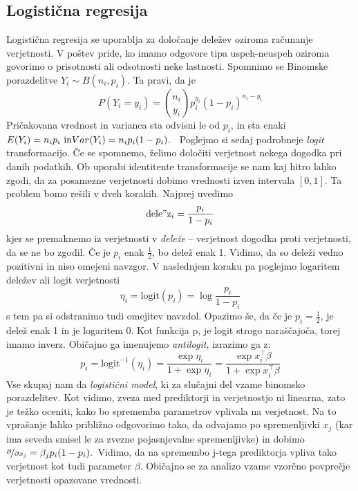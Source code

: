 \documentclass[12pt,a4paper]{amsart}
\theoremstyle{definition} %
\theoremstyle{plain} %
\begin{document}

\subsection{Logistična regresija}
Logistična regresija se uporablja za določanje deležev oziroma računanje verjetnosti. V poštev pride, ko imamo odgovore tipa uspeh-neuspeh oziroma
govorimo o prisotnosti ali odsotnosti neke lastnosti.
Spomnimo se Binomske porazdelitve $Y_{i} \sim B(n_{i}, p_{i})$. Ta pravi, da je 
\[
    P(Y_{i} = y_{i}) = {n_{i} \choose y_{i}} p_{i}^{y_{i}}(1 - p_{i}) ^{n_{i} - y_{i}}
\]
Pričakovana vrednost in varianca sta odvisni le od $p_{i}$, in sta enaki $E(Y_{i}) = n_{i}p_{i} \text{~in}\\Var(Y_{i}) = n_{i}p_{i}(1 - p_{i}).$~
Poglejmo si sedaj podrobneje \textit{logit} transformacijo. Če se spomnemo, želimo določiti verjetnost nekega dogodka pri danih podatkih. Ob uporabi
identitente transformacije se nam kaj hitro lahko zgodi, da za posamezne verjetnosti dobimo vrednosti izven intervala $[0,1]$. Ta problem bomo rešili v 
dveh korakih.
Najprej uvedimo 
\[ 
    \mathrm{dele"z}_{i} = \frac{p_{i}}{1 - p_{i}} %
\]
kjer se premaknemo iz verjetnosti v \textit{deleže} -- verjetnost dogodka proti verjetnosti, da se ne bo zgodil. Če je $p_{i}$ enak $\frac{1}{2}$, 
bo delež enak 1. Vidimo, da so deleži vedno pozitivni in niso omejeni navzgor.
V naslednjem koraku pa poglejmo logaritem deležev ali logit verjetnosti
\[
    \eta_{i} = \mathrm{logit}(p_{i}) = \log \frac{p_{i}}{1 - p_{i}}
\]
s tem pa si odstranimo tudi omejitev navzdol. Opazimo še, da če je $p_{i} = \frac{1}{2}$, je delež enak 1 in je logaritem 0. Kot funkcija p, je logit
strogo naraščajoča, torej imamo inverz. Običajno ga imenujemo \textit{antilogit}, izrazimo ga z:
\[
    p_{i} = \mathrm{logit}^{-1}(\eta_{i}) = \frac{\exp{\eta_{i}}}{1+\exp{\eta_{i}}} = \frac{\exp{x_{i}^\top\beta}}{1+\exp{x_{i}^\top\beta}}
\]
Vse skupaj nam da \textit{logistični model}, ki za slučajni del vzame binomsko porazdelitev. %
Kot vidimo, zveza med prediktorji in verjetnostjo ni linearna, zato je težko oceniti, kako bo sprememba parametrov
vplivala na verjetnost. Na to vprašanje lahko približno odgovorimo tako, da odvajamo po spremenljivki $x_{j}$ (kar ima seveda smisel le za zvezne
pojasnjevalne spremenljivke) in dobimo $\nicefrac{\partial}{\partial x_{j}} = \beta_{j}p_{i}(1 - p_{i}).$~Vidimo, da na spremembo j-tega prediktorja
vpliva tako verjetnost kot tudi parameter $\beta$. Običajno se za analizo vzame vzorčno povprečje verjetnosti opazovane vrednosti.
\end{document}
